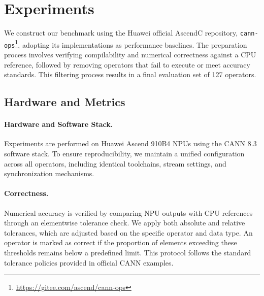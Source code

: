 \documentclass{article}
\theoremstyle{plain}
\theoremstyle{definition}
\theoremstyle{remark}
\begin{document}
\section{Experiments}
\label{sec:experiments}


We construct our benchmark using the Huawei official AscendC repository, \texttt{cann-ops}\footnote{\url{https://gitee.com/ascend/cann-ops}}, adopting its implementations as performance baselines. The preparation process involves verifying compilability and numerical correctness against a CPU reference, followed by removing operators that fail to execute or meet accuracy standards. This filtering process results in a final evaluation set of 127 operators.

\subsection{Hardware and Metrics}
\label{sec:hardware_metrics}


\paragraph{Hardware and Software Stack.}

Experiments are performed on Huawei Ascend 910B4 NPUs using the CANN 8.3 software stack. To ensure reproducibility, we maintain a unified configuration across all operators, including identical toolchains, stream settings, and synchronization mechanisms.

\paragraph{Correctness.}

Numerical accuracy is verified by comparing NPU outputs with CPU references through an elementwise tolerance check. We apply both absolute and relative tolerances, which are adjusted based on the specific operator and data type. An operator is marked as correct if the proportion of elements exceeding these thresholds remains below a predefined limit. This protocol follows the standard tolerance policies provided in official CANN examples.
\end{document}
